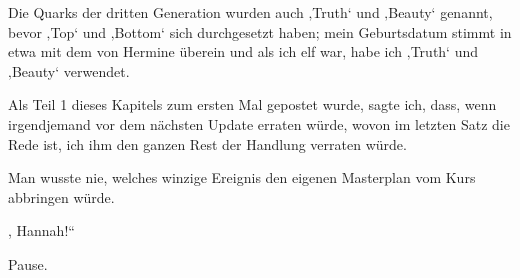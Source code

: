 
\begin{chapterOpeningAuthorNote}



Die Quarks der dritten Generation wurden auch ‚Truth‘ und ‚Beauty‘ genannt, bevor ‚Top‘ und ‚Bottom‘ sich durchgesetzt haben; mein Geburtsdatum stimmt in etwa mit dem von Hermine überein und als ich elf war, habe ich ‚Truth‘ und ‚Beauty‘ verwendet.

Als Teil 1 dieses Kapitels zum ersten Mal gepostet wurde, sagte ich, dass, wenn irgendjemand vor dem nächsten Update erraten würde, wovon im letzten Satz die Rede ist, ich ihm den ganzen Rest der Handlung verraten würde.%
\end{chapterOpeningAuthorNote}
\begin{chapterOpeningQuote}
Man wusste nie, welches winzige Ereignis den eigenen Masterplan vom Kurs abbringen würde.
\end{chapterOpeningQuote}

, Hannah!“

\hplettrineextrapara
Pause.






